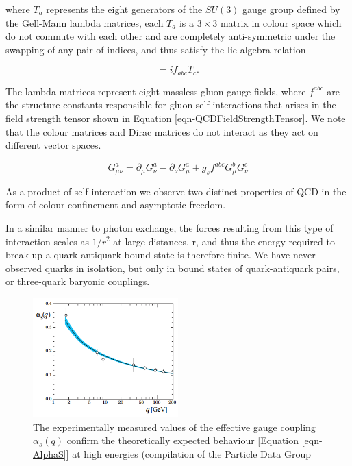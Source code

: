 where $T_a$ represents the eight generators of the $SU(3)$ gauge group defined by the Gell-Mann lambda matrices, each $T_a$ is a $3 \times 3$ matrix in colour space which do not commute with each other and are completely anti-symmetric under the swapping of any pair of indices, and thus satisfy the lie algebra relation  

\begin{equation}
[T_a, T_b] = if_{abc}T_c.
\end{equation}

The lambda matrices represent eight massless gluon gauge fields, where $f^{abc}$ are the structure constants responsible for gluon self-interactions that arises in the field strength tensor shown in Equation \ref{eqn-QCDFieldStrengthTensor}. We note that the colour matrices and Dirac matrices do not interact as they act on different vector spaces. 

\begin{equation} \label{eqn-QCDFieldStrengthTensor}
G^a_{\mu \nu} = \partial_{\mu}G^a_{\nu} - \partial_{\nu}G^a_{\mu} + g_s f^{abc}G^b_{\mu}G^c_{\nu}
\end{equation}

As a product of self-interaction we observe two distinct properties of QCD in the form of colour confinement and asymptotic freedom. 

In a similar manner to photon exchange, the forces resulting from this type of interaction scales as $1/r^2$ at large distances, r, and thus the energy required to break up a quark-antiquark bound state is therefore finite. We have never observed quarks in isolation, but only in bound states of quark-antiquark pairs, or three-quark baryonic couplings.  

\begin{figure} \label{fig-AlphaS}
\begin{center}
\includegraphics[width=0.5\textwidth]{Figures/AlphaS.png}
\caption{The experimentally measured values of the effective gauge coupling $\alpha_s(q)$ confirm the theoretically expected behaviour [Equation \ref{eqn-AlphaS}] at high energies (compilation of the Particle Data Group \cite{AlphaS}}
\end{center}
\end{figure}

